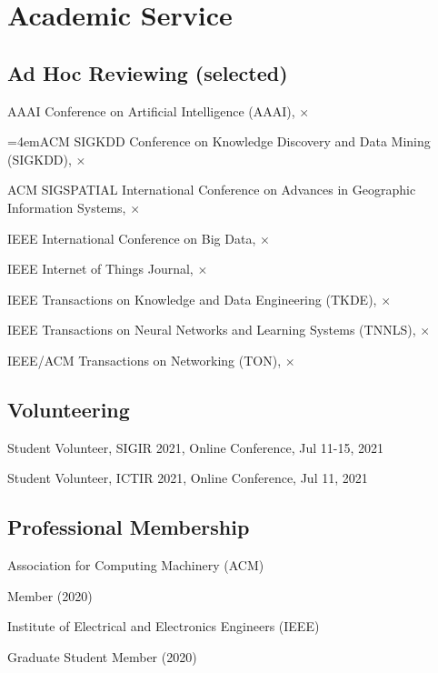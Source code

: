 \section*{Academic Service}


\subsection*{\hspace{1em}Ad Hoc Reviewing (selected)}
\indent

AAAI Conference on Artificial Intelligence (AAAI), $\times$

\hangindent=4emACM SIGKDD Conference on Knowledge Discovery and Data Mining (SIGKDD), $\times$

ACM SIGSPATIAL International Conference on Advances in Geographic Information Systems, $\times$

IEEE International Conference on Big Data, $\times$

IEEE Internet of Things Journal, $\times$


IEEE Transactions on Knowledge and Data Engineering (TKDE), $\times$

IEEE Transactions on Neural Networks and Learning Systems (TNNLS), $\times$

IEEE/ACM Transactions on Networking (TON), $\times$


\subsection*{\hspace{1em}Volunteering}
\indent 

Student Volunteer, SIGIR 2021, Online Conference, Jul 11-15, 2021

Student Volunteer, ICTIR 2021, Online Conference, Jul 11, 2021

\subsection*{\hspace{1em}Professional Membership}
\indent 

Association for Computing Machinery (ACM)  

\hspace{2em}Member (2020)

Institute of Electrical and Electronics Engineers (IEEE)

\hspace{2em}Graduate Student Member (2020)